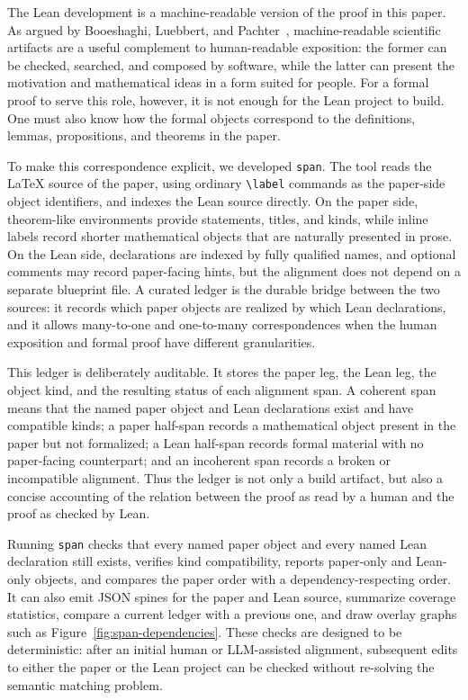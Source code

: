 \documentclass[11pt]{article}
\theoremstyle{plain}
\theoremstyle{definition}
\begin{document}
The Lean development is a machine-readable version of the proof in this paper.
As argued by Booeshaghi, Luebbert, and Pachter~\cite{BLP}, machine-readable
scientific artifacts are a useful complement to human-readable exposition:
the former can be checked, searched, and composed by software, while the latter
can present the motivation and mathematical ideas in a form suited for people.
For a formal proof to serve this role, however, it is not enough for the Lean
project to build.  One must also know how the formal objects correspond to the
definitions, lemmas, propositions, and theorems in the paper.

To make this correspondence explicit, we developed \texttt{span}.  The tool reads
the LaTeX source of the paper, using ordinary \verb|\label| commands as the
paper-side object identifiers, and indexes the Lean source directly.  On the
paper side, theorem-like environments provide statements, titles, and kinds,
while inline labels record shorter mathematical objects that are naturally
presented in prose.  On the Lean side, declarations are indexed by fully
qualified names, and optional comments may record paper-facing hints, but the
alignment does not depend on a separate blueprint file.  A curated ledger is the
durable bridge between the two sources: it records which paper objects are
realized by which Lean declarations, and it allows many-to-one and one-to-many
correspondences when the human exposition and formal proof have different
granularities.

This ledger is deliberately auditable.  It stores the paper leg, the Lean leg,
the object kind, and the resulting status of each alignment span.  A coherent
span means that the named paper object and Lean declarations exist and have
compatible kinds; a paper half-span records a mathematical object present in the
paper but not formalized; a Lean half-span records formal material with no
paper-facing counterpart; and an incoherent span records a broken or incompatible
alignment.  Thus the ledger is not only a build artifact, but also a concise
accounting of the relation between the proof as read by a human and the proof as
checked by Lean.

Running \texttt{span} checks that every named paper object and every named Lean
declaration still exists, verifies kind compatibility, reports paper-only and
Lean-only objects, and compares the paper order with a dependency-respecting
order.  It can also emit JSON spines for the paper and Lean source, summarize
coverage statistics, compare a current ledger with a previous one, and draw
overlay graphs such as Figure~\ref{fig:span-dependencies}.  These checks are
designed to be deterministic: after an initial human or LLM-assisted alignment,
subsequent edits to either the paper or the Lean project can be checked without
re-solving the semantic matching problem.
\end{document}
